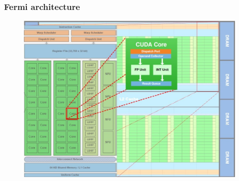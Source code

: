 \documentclass{beamer}
\begin{document}
\begin{frame}
\frametitle{Fermi architecture}
\begin{figure}
	\centering
	\includegraphics[scale=0.27]{fermi4}
\end{figure}

\end{frame}
\end{document}
